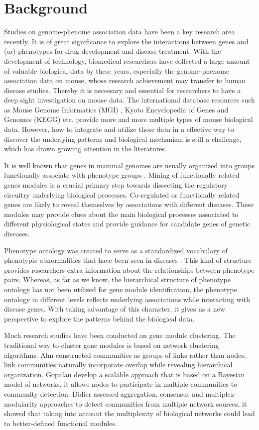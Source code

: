 \documentclass{bmcart}
\begin{document}
\section*{Background}
Studies on genome-phenome association data have been a key research area recently. It is of great significance to explore the interactions between genes and (or) phenotypes for drug development and disease treatment. With the development of technology, biomedical researchers have collected a large amount of valuable biological data by these years, especially the genome-phenome association data on mouse, whose research achievement may transfer to human disease studies. Thereby it is necessary and essential for researchers to have a deep sight investigation on mouse data. The international database resources such as Mouse Genome Informatics (MGI) \cite{Eppig2015}, Kyoto Encyclopedia of Genes and Genomes (KEGG) \cite{Kanehisa2000} etc. provide more and more multiple types of mouse biological data. However, how to integrate and utilize those data in a effective way to discover the underlying patterns and biological mechanism is still a challenge, which has drawn growing attention in the literatures.

It is well known that genes in mammal genomes are usually organized into groups functionally associate with phenotype groups \cite{XuanH2015,Lage2007}. Mining of functionally related genes modules is a crucial primary step towards dissecting the regulatory circuitry underlying biological processes. Co-regulated or functionally related genes are likely to reveal themselves by associations with different diseases. These modules may provide clues about the main biological processes associated to different physiological states and provide guidance for candidate genes of genetic diseases.

Phenotype ontology was created to serve as a standardized vocabulary of phenotypic abnormalities that have been seen in diseases \cite{Kohler2014}. This kind of structure provides researchers extra information about the relationships between phenotype pairs. Whereas, as far as we know, the hierarchical structure of phenotype ontology has not been utilized for gene module identification, the phenotype ontology in different levels reflects underlying associations while interacting with disease genes. With taking advantage of this character, it gives us a new perspective to explore the patterns behind the biological data.

Much research studies have been conducted on gene module clustering. The traditional way to cluster gene modules is based on network clustering algorithms.
Ahn \cite{Ahn2010} constructed communities as groups of links rather than nodes, link communities naturally incorporate overlap while revealing hierarchical organization. Gopalan \cite{Gopalan2013} develop a scalable approach that is based on a Bayesian model of networks, it allows nodes to participate in multiple communities to community detection. Didier \cite{Didier2015} assessed aggregation, consensus and multiplex-modularity approaches to detect communities from multiple network sources, it showed that taking into account the multiplexity of biological networks could lead to better-defined functional modules.
\end{document}
